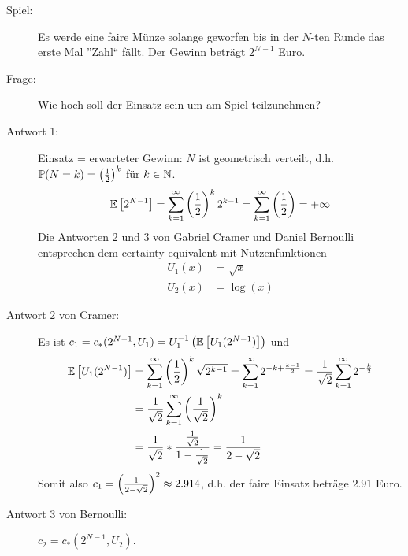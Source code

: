 


\begin{description}
	\item[Spiel:] Es werde eine faire Münze solange geworfen bis in der $N$-ten Runde das erste Mal ''Zahl`` fällt. Der Gewinn beträgt $2^{N-1}$ Euro.
	\item[Frage:] Wie hoch soll der Einsatz sein um am Spiel teilzunehmen?
	\item[Antwort 1:] Einsatz = erwarteter Gewinn: $N$ ist geometrisch verteilt, d.h. $\mathbb{P}(N = k) = \left( \frac{1}{2} \right)^k$ für $k \in \mathbb{N}$.
	\begin{equation*}
		\mathbb{E} \left[ 2^{N-1} \right] 
		= \sum_{k=1}^\infty \left( \frac{1}{2} \right)^k 2^{k-1} 
		= \sum_{k=1}^\infty \left( \frac{1}{2} \right) 
		= + \infty
	\end{equation*}
	Die Antworten 2 und 3 von Gabriel Cramer und Daniel Bernoulli entsprechen dem certainty equivalent mit Nutzenfunktionen
	\begin{align*}
			U_1(x) &= \sqrt{x} \tag{Cramer} \\
			U_2(x) &= \log(x) \tag{Bernoulli}
	\end{align*}
	\item[Antwort 2 von Cramer:] Es ist $c_1 = c_\ast (2^{N-1}, U_1) = U_1^{-1} \left( \mathbb{E} \left[ U_1(2^{N-1}) \right] \right)$ und
	\begin{equation*}
		\begin{aligned}
			\mathbb{E} \left[ U_1(2^{N-1}) \right] 
			&= \sum_{k=1}^\infty \left( \frac{1}{2} \right)^k \sqrt{2^{k-1}} 
			= \sum_{k=1}^\infty 2^{-k + \frac{k-1}{2}} 
			= \frac{1}{\sqrt{2}} \sum_{k=1}^\infty 2^{-\frac{k}{2}} \\
			&= \frac{1}{\sqrt{2}} \sum_{k = 1}^\infty \left( \frac{1}{\sqrt{2}} \right)^k \\
			&= \frac{1}{\sqrt{2}} * \frac{\frac{1}{\sqrt{2}}}{1 - \frac{1}{\sqrt{2}}}
			= \frac{1}{2 - \sqrt{2}}
		\end{aligned}
	\end{equation*}
	Somit also $c_1 = \left( \frac{1}{2-\sqrt{2}} \right)^2 \approx 2.914$, d.h. der faire Einsatz beträge $2.91$ Euro.
	\item[Antwort 3 von Bernoulli:] $c_2 = c_\ast (2^{N-1}, U_2)$.
	\begin{equation*}
		\begin{aligned}

\end{aligned}
\end{equation*}
\end{description}
